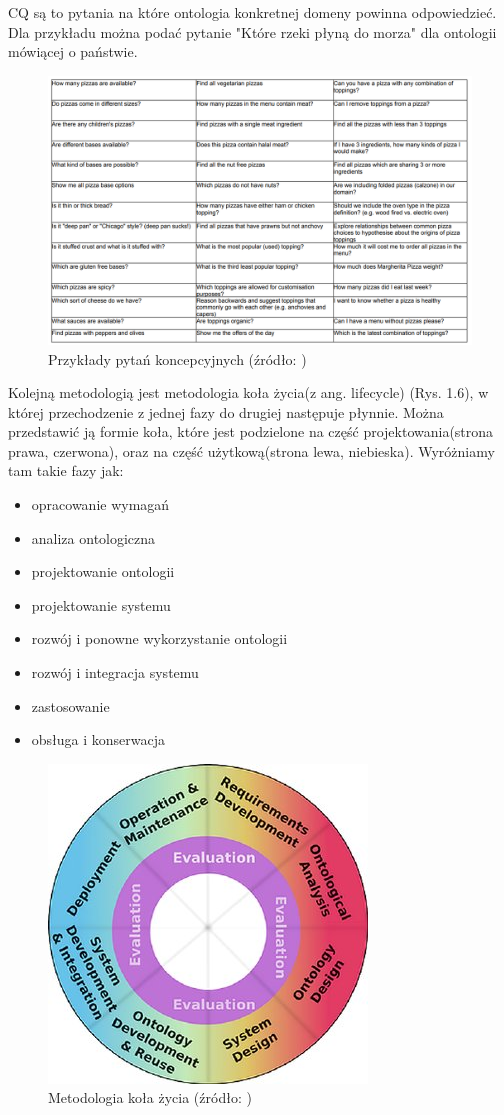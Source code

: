 \documentclass[a4paper,12pt, twoside]{book} %
\begin{document}
CQ są to pytania na które ontologia konkretnej domeny powinna odpowiedzieć. Dla przykładu można podać pytanie "Które rzeki płyną do morza" dla ontologii mówiącej o państwie.
\begin{figure}[h]
	\centering
	\includegraphics[scale=0.55]{CQ.png}
	\caption{Przykłady pytań koncepcyjnych (źródło: \cite{CQ})}
\end{figure}

Kolejną metodologią jest metodologia koła życia(z ang. lifecycle) \cite{C.MariaKeet.2020}(Rys. 1.6), w której przechodzenie z jednej fazy do drugiej następuje płynnie. Można przedstawić ją formie koła, które jest podzielone na część projektowania(strona prawa, czerwona), oraz na część użytkową(strona lewa, niebieska).
Wyróżniamy tam takie fazy jak:
\begin{itemize}
	\item opracowanie wymagań
	\item analiza ontologiczna
	\item projektowanie ontologii
	\item projektowanie systemu
	\item rozwój i ponowne wykorzystanie ontologii
	\item rozwój i integracja systemu
	\item zastosowanie
	\item obsługa i konserwacja
\end{itemize}
\begin{figure}[h]
	\centering
	\includegraphics[scale=0.85]{lifecycle.jpg}
	\caption{Metodologia koła życia (źródło: \cite{lifecycle})}
\end{figure}
\end{document}
